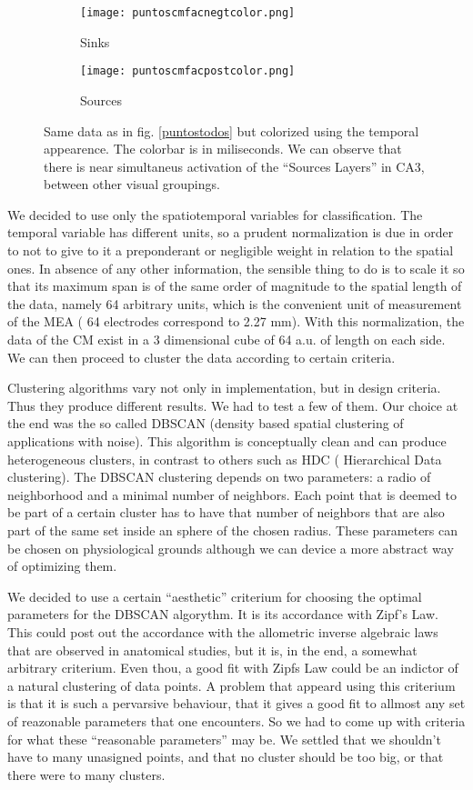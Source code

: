 \documentclass{article}
\begin{document}
\begin{figure}
\centering
\begin{subfigure}{0.40\textwidth}
\texttt{[image: puntoscmfacnegtcolor.png]}
\caption{Sinks}
\end{subfigure}
\begin{subfigure}{0.40\textwidth}
\texttt{[image: puntoscmfacpostcolor.png]}
\caption{Sources}
\end{subfigure}

\caption{Same data as in fig. \ref{puntostodos} but colorized using
the temporal appearence. The colorbar is in miliseconds. We can observe
that there is near simultaneus activation of the ``Sources Layers'' in CA3,
between other visual groupings. 
}\label{puntosconcolor}

\end{figure}


We decided to  use only the spatiotemporal variables for classification. 
The temporal variable has different units, so a prudent normalization is due
in order to not to give to it a preponderant or negligible weight in relation to the
spatial ones. In absence of any other information, the sensible thing to do is to
scale it so that its maximum span is of the same order of magnitude to the
spatial length of the data, namely 64 arbitrary units, which is the convenient unit
of measurement of the MEA ( 64 electrodes correspond to 2.27 mm).
With this normalization, the data of the CM exist in a 3 dimensional cube of 64 a.u.
of length on each side. We can then proceed to cluster the data according to
certain criteria.

Clustering algorithms vary not only in implementation, but in design criteria.
Thus they produce different results. We had to test a few of them. Our choice at the
end was the so called DBSCAN (density based spatial clustering of applications with noise).
This algorithm is conceptually clean and can produce heterogeneous clusters, in contrast
to others such as HDC ( Hierarchical Data clustering). The DBSCAN clustering depends
on two parameters: a radio of neighborhood and a minimal number of neighbors. Each
point that is deemed to be part of a certain cluster has to have that number of neighbors
that are also part of the same set inside an sphere of the chosen radius. These
parameters can be chosen on physiological grounds although we can device a more
abstract way of optimizing them. 

We decided to use a certain ``aesthetic'' criterium for choosing the optimal parameters
for the DBSCAN algorythm.  It is its accordance with Zipf's Law.  This could post out
the accordance with the allometric inverse algebraic laws that are observed in
anatomical studies, but it is, in the end, a somewhat arbitrary criterium. Even thou, a good
fit with Zipfs Law could be an indictor of a natural clustering of data points.
A problem that appeard using this criterium is that it is such a pervarsive
behaviour, that it gives a good fit to allmost any set of reazonable parameters
that one encounters. So we had to come up with criteria for what these ``reasonable
parameters'' may be.  We settled that we shouldn't have to many unasigned points, and
that no cluster should be too big, or that there were to many clusters. 
\end{document}
